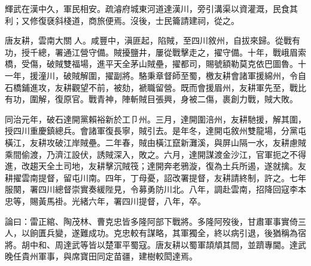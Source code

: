\begin{pinyinscope}
輝武在漢中久，軍民相安。疏濬府城東河道達漢川，旁引溝渠以資灌溉，民食其利；又修復褎斜棧道，商旅便焉。沒後，士民籥請建祠，從之。

唐友耕，雲南大關人。咸豐中，滇匪起，陷賊，至四川敘州，自拔來歸。從戰有功，授千總，署通江營守備。賊擾鹽井，屢從戰擊走之，擢守備。十年，戰峨眉索橋，受傷，破賊雙福場，進平天全茅山賊壘，擢都司，賜號額勒莫克依巴圖魯。十一年，援潼川，破賊解圍，擢副將。駱秉章督師至蜀，檄友耕會諸軍援綿州，令自石橋鋪進攻，友耕觀望不前，被劾，褫職留營。既而會援眉州，友耕軍先至，戰比有功，圍解，復原官。戰青神，陣斬賊目張興，身被二傷，裹創力戰，賊大敗。

同治元年，破石達開黨賴裕新於工⼙州。三月，達開圍涪州，友耕馳援，解其圍，授四川重慶鎮總兵。會諸軍復長寧，賊引去。是年冬，達開屯敘州雙龍場，分黨屯橫江，友耕攻破江岸賊壘。二年春，賊由橫江竄新灘溪，與屏山隔一水，友耕慮賊乘間偷渡，乃濟江設伏，誘賊深入，敗之。六月，達開謀渡金沙江，官軍扼之不得進，改趨天全土司地，友耕擊沉賊筏；達開奔老鴉漩，復為土兵所遏，遂就擒。友耕擢雲南提督，留屯川南。四年，丁母憂，詔改署提督，友耕請終制，許之。七年服闋，署四川總督崇實奏緩陛見，令募勇防川北。八年，調赴雲南，招降回寇李本忠等，賜黃馬褂。光緒六年，署四川提督，八年，卒。

論曰：雷正綰、陶茂林、曹克忠皆多隆阿部下戰將。多隆阿歿後，甘肅軍事實倚三人，以餉匱兵變，遂難成功。克忠較有謀略，其軍獨全，終以病引退，後猶稱為宿將。胡中和、周達武等皆以楚軍平蜀寇。唐友耕以蜀軍頡頏其間，並躋專閫。達武晚任貴州軍事，與席寶田同定苗疆，建樹較閎達焉。


\end{pinyinscope}